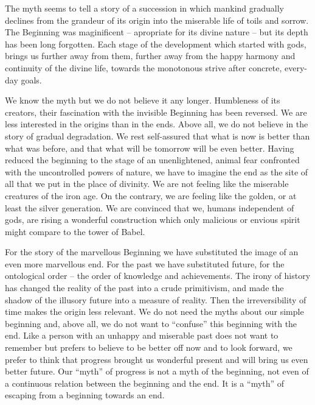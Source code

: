\normalsize\noindent 
The myth seems to tell a story of a succession in which mankind gradually declines 
from the grandeur of its origin into the miserable life of toils and sorrow. The Beginning
was maginificent -- apropriate for its divine nature -- but its depth has been
long forgotten. Each stage of the development which started with gods, brings 
us further away from them, further away from the happy
harmony and continuity of the divine life, towards the monotonous strive after
concrete, every-day goals.

We know the myth but we do not believe it any longer. Humbleness of its 
creators, their fascination with the invisible Beginning has been reversed.
We are less interested in the origins than in the ends. 
Above all, we do not believe in the story of gradual degradation. We rest
self-assured that what is now is better than what was before, and that what
will be tomorrow will be even better. 
Having reduced the beginning to the stage of an unenlightened, animal fear
confronted with the uncontrolled powers of nature, we have to imagine the end
as the site of all that we put in the place of divinity.
We 
are not feeling like the miserable creatures of the iron age. On the contrary,
we are feeling like the golden, or at least the silver generation.
We are convinced that we, humans independent of gods, are rising a wonderful 
construction which only malicious or envious spirit might compare to the
tower of Babel.

For the story of the marvellous 
Beginning we have substituted the image of an even more marvellous end. 
For the past we have
substituted future, for the ontological order -- the order of knowledge and
achievements. The irony of history has changed the reality of the past into 
a crude primitivism, and made the shadow of the illusory future into a measure
of reality.
Then the irreversibility of time makes the origin less relevant. We
do not need the myths about our simple beginning and, above all, we do not 
want to
``confuse'' this beginning with the end. Like a person with an unhappy and 
miserable past does not want to remember but prefers to believe to be better
off now and to look forward, we prefer to think that progress brought us
wonderful present and will bring us even better future. Our ``myth''
of progress is not a myth of the beginning, not even of a continuous relation 
between the beginning and the end. It is a ``myth'' of escaping from a beginning 
towards an end.


